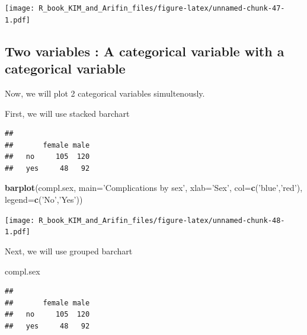\documentclass[]{book}
\newenvironment{Shaded}{\begin{snugshade}}{\end{snugshade}}
\newcommand{\KeywordTok}[1]{\textcolor[rgb]{0.13,0.29,0.53}{\textbf{#1}}}
\newcommand{\DataTypeTok}[1]{\textcolor[rgb]{0.13,0.29,0.53}{#1}}
\newcommand{\StringTok}[1]{\textcolor[rgb]{0.31,0.60,0.02}{#1}}
\newcommand{\OperatorTok}[1]{\textcolor[rgb]{0.81,0.36,0.00}{\textbf{#1}}}
\newcommand{\NormalTok}[1]{#1}
\theoremstyle{definition}
\theoremstyle{definition}
\theoremstyle{remark}
\begin{document}
\texttt{[image: R\_book\_KIM\_and\_Arifin\_files/figure-latex/unnamed-chunk-47-1.pdf]}

\subsection{Two variables : A categorical variable with a categorical
variable}\label{two-variables-a-categorical-variable-with-a-categorical-variable}

Now, we will plot 2 categorical variables simultenously.

First, we will use stacked barchart

\begin{Shaded}
\end{Shaded}

\begin{verbatim}
##      
##       female male
##   no     105  120
##   yes     48   92
\end{verbatim}

\begin{Shaded}
\begin{Highlighting}[]
\KeywordTok{barplot}\NormalTok{(compl.sex,}
        \DataTypeTok{main=}\StringTok{'Complications by sex'}\NormalTok{,}
        \DataTypeTok{xlab=}\StringTok{'Sex'}\NormalTok{,}
        \DataTypeTok{col=}\KeywordTok{c}\NormalTok{(}\StringTok{'blue'}\NormalTok{,}\StringTok{'red'}\NormalTok{),}
        \DataTypeTok{legend=}\KeywordTok{c}\NormalTok{(}\StringTok{'No'}\NormalTok{,}\StringTok{'Yes'}\NormalTok{))}
\end{Highlighting}
\end{Shaded}

\texttt{[image: R\_book\_KIM\_and\_Arifin\_files/figure-latex/unnamed-chunk-48-1.pdf]}

Next, we will use grouped barchart

\begin{Shaded}
\begin{Highlighting}[]
\NormalTok{compl.sex}
\end{Highlighting}
\end{Shaded}

\begin{verbatim}
##      
##       female male
##   no     105  120
##   yes     48   92
\end{verbatim}
\end{document}
